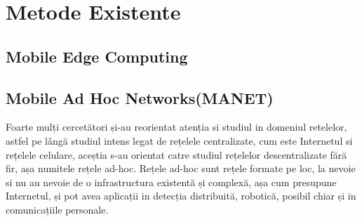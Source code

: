 \documentclass[12pt,a4paper]{report}
\begin{document}
\chapter{Metode Existente}

\section{Mobile Edge Computing}
\section{Mobile Ad Hoc Networks(MANET)}
Foarte mulți cercetători și-au reorientat atenția si studiul in domeniul retelelor, astfel pe lângă studiul intens legat de rețelele centralizate, cum este Internetul si rețelele celulare, aceștia s-au orientat catre studiul rețelelor descentralizate fără fir, așa numitele rețele ad-hoc. Rețele ad-hoc sunt rețele formate pe loc, la nevoie si nu au nevoie de o infrastructura existentă și complexă, așa cum presupune Internetul, și pot avea aplicații in detecția distribuită, robotică, posibil chiar și in comunicațiile personale.~\cite{MITarticle}
\end{document}
